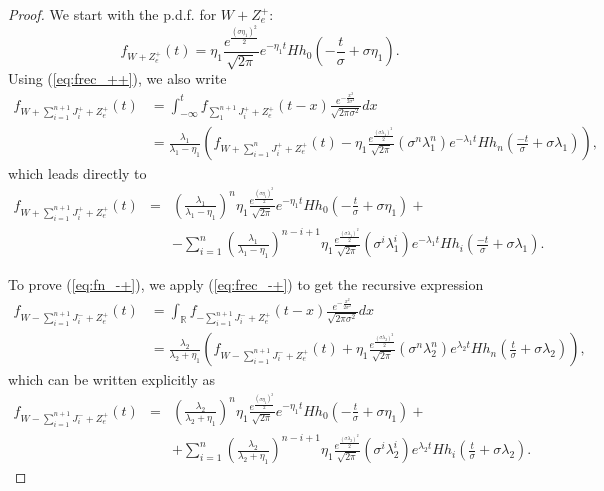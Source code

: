 \documentclass[11pt]{article}
\numberwithin{equation}{section}
\numberwithin{theorem}{section}
\begin{document}
\begin{proof}  We start with the  p.d.f. for $W + Z_{e}^{+}$:
\[
f_{W+Z_{e}^{+}}\left(t\right)=\eta_{1}\frac{e^{\frac{\left(\sigma\eta_{1}\right)^{2}}{2}}}{\sqrt{2\pi}}e^{-\eta_{1}t}Hh_{0}\left(-\frac{t}{\sigma}+\sigma\eta_{1}\right).
\]
Using (\ref{eq:frec_++}), we also write 
\begin{align*}
f_{W+\sum_{i=1}^{n+1}J_{i}^{+}+Z_{e}^{+}}\left(t\right) & =\int_{-\infty}^{t}f_{\sum_{1}^{n+1}J_{i}^{+}+Z_{e}^{+}}\left(t-x\right)\frac{e^{-\frac{x{}^{2}}{2\sigma^{2}}}}{\sqrt{2\pi\sigma^{2}}}dx\\
 & =\frac{\lambda_{1}}{\lambda_{1}-\eta_{1}}\left(f_{W+\sum_{i=1}^{n}J_{i}^{+}+Z_{e}^{+}}\left(t\right)-\eta_{1}\frac{e^{\frac{\left(\sigma\lambda_{1}\right)^{2}}{2}}}{\sqrt{2\pi}}\left(\sigma^{n}\lambda_{1}^{n}\right)e^{-\lambda_{1}t}Hh_{n}\left(\frac{-t}{\sigma}+\sigma\lambda_{1}\right)\right),
\end{align*}
 which leads directly to 
\begin{eqnarray*}
f_{W+\sum_{i=1}^{n+1}J_{i}^{+}+Z_{e}^{+}}\left(t\right) & = & \left(\frac{\lambda_{1}}{\lambda_{1}-\eta_{1}}\right)^{n}\eta_{1}\frac{e^{\frac{\left(\sigma\eta_{1}\right)^{2}}{2}}}{\sqrt{2\pi}}e^{-\eta_{1}t}Hh_{0}\left(-\frac{t}{\sigma}+\sigma\eta_{1}\right)+\\
 &  & -\sum_{i=1}^{n}\left(\frac{\lambda_{1}}{\lambda_{1}-\eta_{1}}\right)^{n-i+1}\eta_{1}\frac{e^{\frac{\left(\sigma\lambda_{1}\right)^{2}}{2}}}{\sqrt{2\pi}}\left(\sigma^{i}\lambda_{1}^{i}\right)e^{-\lambda_{1}t}Hh_{i}\left(\frac{-t}{\sigma}+\sigma\lambda_{1}\right).
\end{eqnarray*}


To prove  (\ref{eq:fn_-+}), we apply  (\ref{eq:frec_-+}) to get  the recursive
expression 
\begin{align*}
f_{W-\sum_{i=1}^{n+1}J_{i}^{-}+Z_{e}^{+}}\left(t\right) & =\int_{\mathbb{R}}f_{-\sum_{i=1}^{n+1}J_{i}^{-}+Z_{e}^{+}}\left(t-x\right)\frac{e^{-\frac{x{}^{2}}{2\sigma^{2}}}}{\sqrt{2\pi\sigma^{2}}}dx\\
 & =\frac{\lambda_{2}}{\lambda_{2}+\eta_{1}}\left(f_{W-\sum_{i=1}^{n+1}J_{i}^{-}+Z_{e}^{+}}\left(t\right)+\eta_{1}\frac{e^{\frac{\left(\sigma\lambda_{2}\right)^{2}}{2}}}{\sqrt{2\pi}}\left(\sigma^{n}\lambda_{2}^{n}\right)e^{\lambda_{2}t}Hh_{n}\left(\frac{t}{\sigma}+\sigma\lambda_{2}\right)\right),
\end{align*}
 which can be written explicitly as  
\begin{eqnarray*}
f_{W-\sum_{i=1}^{n+1}J_{i}^{-}+Z_{e}^{+}}\left(t\right) & = & \left(\frac{\lambda_{2}}{\lambda_{2}+\eta_{1}}\right)^{n}\eta_{1}\frac{e^{\frac{\left(\sigma\eta_{1}\right)^{2}}{2}}}{\sqrt{2\pi}}e^{-\eta_{1}t}Hh_{0}\left(-\frac{t}{\sigma}+\sigma\eta_{1}\right)+\\
 &  & +\sum_{i=1}^{n}\left(\frac{\lambda_{2}}{\lambda_{2}+\eta_{1}}\right)^{n-i+1}\eta_{1}\frac{e^{\frac{\left(\sigma\lambda_{2}\right)^{2}}{2}}}{\sqrt{2\pi}}\left(\sigma^{i}\lambda_{2}^{i}\right)e^{\lambda_{2}t}Hh_{i}\left(\frac{t}{\sigma}+\sigma\lambda_{2}\right).
\end{eqnarray*}
\end{proof}
\end{document}
